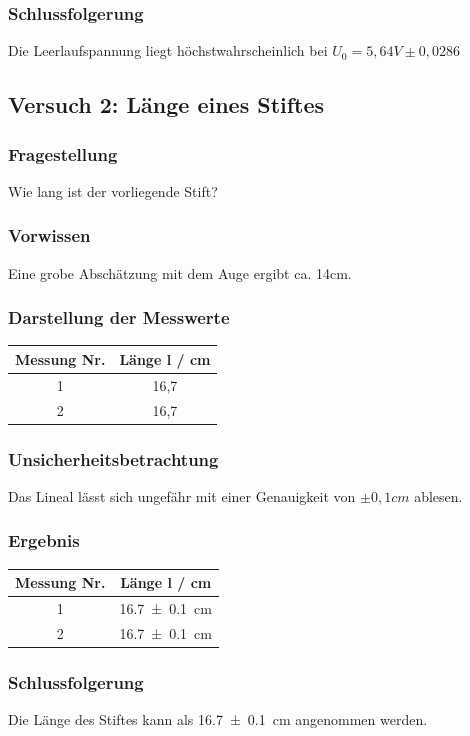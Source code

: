 \documentclass[
	a4paper,
	12pt,
	pagesize,
	ngerman
]{scrartcl}
\begin{document}
	\subsubsection{Schlussfolgerung}
	Die Leerlaufspannung liegt höchstwahrscheinlich bei $U_0=5,64\si{V} \pm 0,0286$
	
	\newpage
	\subsection{Versuch 2: Länge eines Stiftes}
	
	\subsubsection{Fragestellung}
	Wie lang ist der vorliegende Stift?
	\subsubsection{Vorwissen}
	Eine grobe Abschätzung mit dem Auge ergibt ca. 14\si{cm}.
	\subsubsection{Darstellung der Messwerte}
	\begin{tabular}{| c | c |}
		\hline
		Messung Nr. & Länge l  / \si{cm}\\ \hline
		1 & 16,7\\
		2 & 16,7\\ \hline
	\end{tabular}
	\subsubsection{Unsicherheitsbetrachtung}
	Das Lineal lässt sich ungefähr mit einer Genauigkeit von $\pm 0,1 \si{cm}$ ablesen.
	\subsubsection{Ergebnis}
	\begin{tabular}{| c | c |}
		\hline
		Messung Nr. & Länge l  / \si{cm}\\ \hline
		1 & \SI{16,7 \pm 0,1}{cm}\\
		2 & \SI{16,7 \pm 0,1}{cm}\\ \hline
	\end{tabular}
	\subsubsection{Schlussfolgerung}
	Die Länge des Stiftes kann als \SI{16,7 \pm 0,1}{cm} angenommen werden.
	\newpage
\end{document}
